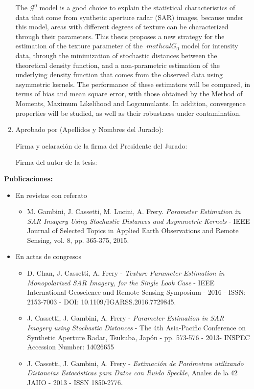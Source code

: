 \begin{enumerate}
	The $\mathcal{G}^0$ model is a good choice to explain the statistical characteristics of data that come from synthetic aperture radar (SAR) images, because under this model, areas with different degrees of texture can be characterized through their parameters. This thesis proposes a new strategy for the estimation of the texture parameter of the $ \ mathcal G_0 $ model for intensity data, through the minimization of stochastic distances between the theoretical density function, and a non-parametric estimation of the underlying density function that comes from the observed data using asymmetric kernels. The performance of these estimators will be compared, in terms of bias and mean square error, with those obtained by the Method of Moments, Maximum Likelihood and Logcumulants. In addition, convergence properties will be studied, as well as their robustness under contamination.

\item Aprobado por (Apellidos y Nombres del Jurado):

\bigskip\bigskip\bigskip\bigskip

Firma y aclaración de la firma del Presidente del Jurado:				

\bigskip\bigskip\bigskip\bigskip

Firma del autor de la tesis:

\end{enumerate}

\newpage
	
\textbf{Publicaciones:}
\begin{itemize}
	\item En revistas con referato
	\begin{itemize}
		\item M. Gambini, J. Cassetti, M. Lucini, A. Frery. \emph{Parameter Estimation in SAR Imagery Using Stochastic Distances and Asymmetric Kernels} - IEEE Journal of Selected Topics in Applied Earth Observations and Remote Sensing, vol. 8, pp. 365-375, 2015.
	\end{itemize}
	\item En actas de congresos
	\begin{itemize}
		\item  D. Chan, J. Cassetti, A. Frery - \emph{Texture Parameter Estimation in Monopolarized SAR Imagery, for the Single Look Case} - IEEE International Geoscience and Remote Sensing Symposium - 2016 - ISSN: 2153-7003 -  DOI: 10.1109/IGARSS.2016.7729845.
		
		\item J. Cassetti, J. Gambini, A. Frery - \emph{Parameter Estimation in SAR Imagery using Stochastic Distances} - The 4th Asia-Pacific Conference on Synthetic Aperture Radar, Tsukuba, Japón - pp. 573-576 - 2013- INSPEC Accession Number: 14026655 
		
		\item J. Cassetti, J. Gambini, A. Frery - \emph{Estimación de Parámetros utilizando Distancias Estocásticas para Datos con Ruido Speckle}, Anales de la 42 JAIIO - 2013 - ISSN 1850-2776.
	\end{itemize}
\end{itemize}

